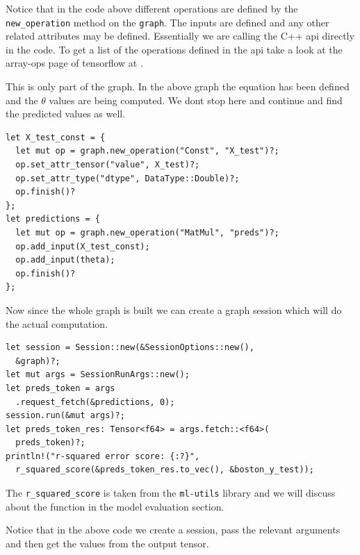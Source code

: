 \documentclass{book}
\begin{document}
Notice that in the code above different operations are defined by the \lstinline{new_operation} method on the \lstinline{graph}. The inputs are defined and any other related attributes may be defined. Essentially we are calling the C++ api directly in the code. To get a list of the operations defined in the api take a look at the array-ops page of tensorflow at \href{https:/www.tensorflow.org/api_docs/cc/group/array-ops}{}.

This is only part of the graph. In the above graph the equation has been defined and the $\theta$ values are being computed. We dont stop here and continue and find the predicted values as well.

\begin{lstlisting}[caption={chapter2\\/rustlymachine\_regression\\/src\\/lin\_reg\\.rs}]
let X_test_const = {
  let mut op = graph.new_operation("Const", "X_test")?;
  op.set_attr_tensor("value", X_test)?;
  op.set_attr_type("dtype", DataType::Double)?;
  op.finish()?
};
let predictions = {
  let mut op = graph.new_operation("MatMul", "preds")?;
  op.add_input(X_test_const);
  op.add_input(theta);
  op.finish()?
};
\end{lstlisting}

Now since the whole graph is built we can create a graph session which will do the actual computation.

\begin{lstlisting}[caption={chapter2\\/rustlymachine\_regression\\/src\\/lin\_reg\\.rs}]
let session = Session::new(&SessionOptions::new(),
  &graph)?;
let mut args = SessionRunArgs::new();
let preds_token = args
  .request_fetch(&predictions, 0);
session.run(&mut args)?;
let preds_token_res: Tensor<f64> = args.fetch::<f64>(
  preds_token)?;
println!("r-squared error score: {:?}",
  r_squared_score(&preds_token_res.to_vec(), &boston_y_test));
\end{lstlisting}

The \lstinline{r_squared_score} is taken from the \lstinline{ml-utils} library and we will discuss about the function in the model evaluation section.

Notice that in the above code we create a session, pass the relevant arguments and then get the values from the output tensor.
\end{document}
